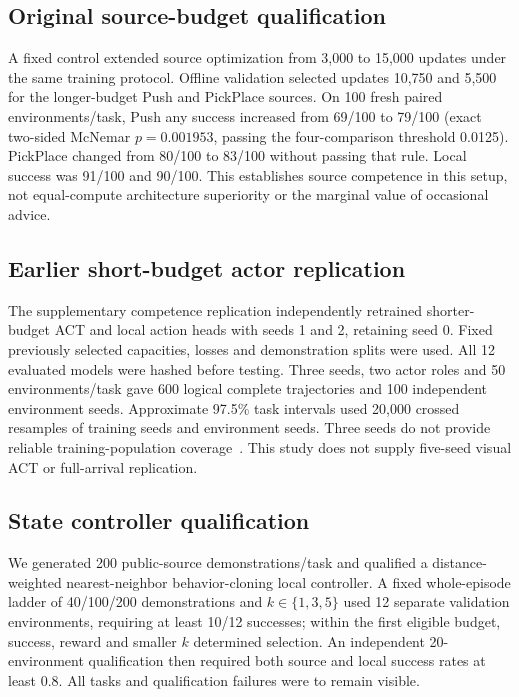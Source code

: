 \subsection{Original source-budget qualification}
A fixed control extended source optimization from 3,000 to 15,000 updates under the same training protocol. Offline validation selected updates 10,750 and 5,500 for the longer-budget Push and PickPlace sources. On 100 fresh paired environments/task, Push any success increased from 69/100 to 79/100 (exact two-sided McNemar $p=0.001953$, passing the four-comparison threshold 0.0125). PickPlace changed from 80/100 to 83/100 without passing that rule. Local success was 91/100 and 90/100. This establishes source competence in this setup, not equal-compute architecture superiority or the marginal value of occasional advice.



\subsection{Earlier short-budget actor replication}
The supplementary competence replication independently retrained shorter-budget ACT and local action heads with seeds 1 and 2, retaining seed 0. Fixed previously selected capacities, losses and demonstration splits were used. All 12 evaluated models were hashed before testing. Three seeds, two actor roles and 50 environments/task gave 600 logical complete trajectories and 100 independent environment seeds. Approximate 97.5\% task intervals used 20,000 crossed resamples of training seeds and environment seeds. Three seeds do not provide reliable training-population coverage~\cite{agarwal}. This study does not supply five-seed visual ACT or full-arrival replication.



\subsection{State controller qualification}
We generated 200 public-source demonstrations/task and qualified a distance-weighted nearest-neighbor behavior-cloning local controller. A fixed whole-episode ladder of 40/100/200 demonstrations and $k\in\{1,3,5\}$ used 12 separate validation environments, requiring at least 10/12 successes; within the first eligible budget, success, reward and smaller $k$ determined selection. An independent 20-environment qualification then required both source and local success rates at least 0.8. All tasks and qualification failures were to remain visible.



